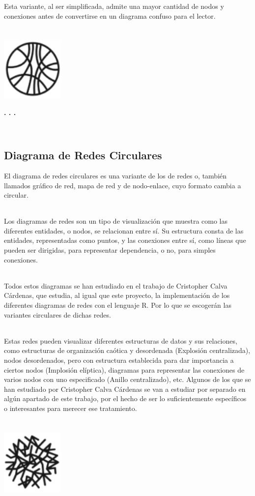 \documentclass{article}\usepackage[]{graphicx}\usepackage[]{color}
\begin{document}
Esta variante, al ser simplificada, admite una mayor cantidad de nodos y conexiones antes de convertirse en un diagrama confuso para el lector.
~\\~\\~\\
\vbox{
    \centering
    \includegraphics[width=0.23\textwidth]{imag/cuer}
}
\begin{center}
\textbf{. . .}
\end{center}
~\\
\subsection{Diagrama de Redes Circulares}
El diagrama de redes circulares es una variante de los de redes o, tambi\'en llamados gr\'afico de red, mapa de red y de nodo-enlace, cuyo formato cambia a circular.~\\~\par
Los diagramas de redes son un tipo de visualizaci\'on que muestra como las diferentes entidades, o nodos, se relacionan entre s\'i. Su estructura consta de las entidades, representadas como puntos, y las conexiones entre s\'i, como l\'ineas que pueden ser dirigidas, para representar dependencia, o no, para simples conexiones.~\\~\par
Todos estos diagramas se han estudiado en el trabajo de Cristopher Calva C\'ardenas\cite{tfg}, que estudia, al igual que este proyecto, la implementaci\'on de los diferentes diagramas de redes con el lenguaje R. Por lo que se escoger\'an las variantes circulares de dichas redes.~\\~\par
Estas redes pueden visualizar diferentes estructuras de datos y sus relaciones, como estructuras de organizaci\'on ca\'otica y desordenada (Explosi\'on centralizada),  nodos desordenados, pero con estructura establecida para dar importancia a ciertos nodos (Implosi\'on el\'iptica), diagramas para representar las conexiones de varios nodos con uno especificado (Anillo centralizado), etc.  Algunos de los que se han estudiado por Cristopher Calva C\'ardenas se van a estudiar por separado en alg\'un apartado de este trabajo, por el hecho de ser lo suficientemente espec\'ificos o interesantes para merecer ese tratamiento. 
~\\~\\~\\
\vbox{
    \centering
    \includegraphics[width=0.23\textwidth]{imag/redes}
}
\clearpage


\end{document}
